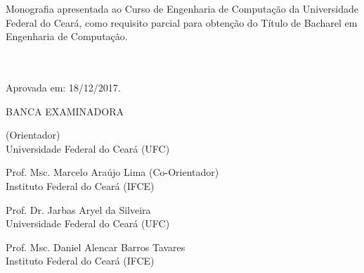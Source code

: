 \begin{folhadeaprovacao}
	
	\begin{center}
		{\MakeUppercase\imprimirautor}
		\vspace{1cm}
		
		\begin{center}
			\MakeUppercase\imprimirtitulo
		\end{center}
		
		\vspace{2cm}
		\hspace{.45\textwidth}
		\begin{minipage}{0.5\textwidth}
			Monografia apresentada ao Curso de Engenharia de Computação da Universidade Federal do Ceará, como requisito parcial para obtenção do Título de Bacharel em Engenharia de Computação.
			\\ \\ \\
		\end{minipage}
		
		\vspace{-0.5cm}
		
		\begin{minipage}{\textwidth}
			Aprovada em: 18/12/2017.
		\end{minipage}
		
		\vspace{0.5cm}
		BANCA EXAMINADORA
	\end{center}
	
	\def\spacebetweensigns{-12pt}
	
	\vspace{\spacebetweensigns}
	\assinatura{}
	\vspace{\spacebetweensigns}
	\begin{center}
		{\imprimirorientador \space (Orientador) \\ Universidade Federal do Ceará (UFC)}
	\end{center}
	
	
	\vspace{\spacebetweensigns}
	\assinatura{}
	\vspace{\spacebetweensigns}
	\begin{center}
		{Prof. Msc. Marcelo Araújo Lima  \space (Co-Orientador) \\ Instituto Federal do Ceará (IFCE)}
	\end{center}
	
	\vspace{\spacebetweensigns}
	\assinatura{}
	\vspace{\spacebetweensigns}
	\begin{center}
		{Prof. Dr. Jarbas Aryel da Silveira \\ Universidade Federal do Ceará (UFC)}
	\end{center}
	
	\vspace{\spacebetweensigns}
	\assinatura{}
	\vspace{\spacebetweensigns}
	\begin{center}
		{Prof. Msc. Daniel Alencar Barros Tavares \\ Instituto Federal do Ceará (IFCE)}
	\end{center}
		
\end{folhadeaprovacao}
